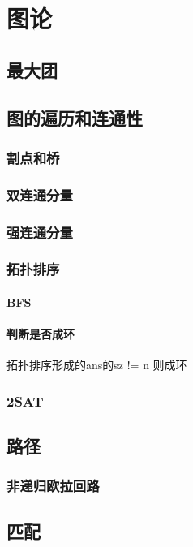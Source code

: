 \documentclass[main.tex]{subfiles}
\begin{document}
\chapter{图论}
	\section{最大团}
		
		\section{图的遍历和连通性}
        \subsection{割点和桥}
            
        \subsection{双连通分量}
            
        \subsection{强连通分量}
            
        \subsection{拓扑排序}
            \subsubsection{BFS}
            \subsubsection{判断是否成环}
            拓扑排序形成的ans的sz != n 则成环
        \subsection{2SAT}
            
    \section{路径}
        \subsection{非递归欧拉回路}
            
    \section{匹配}
\end{document}
